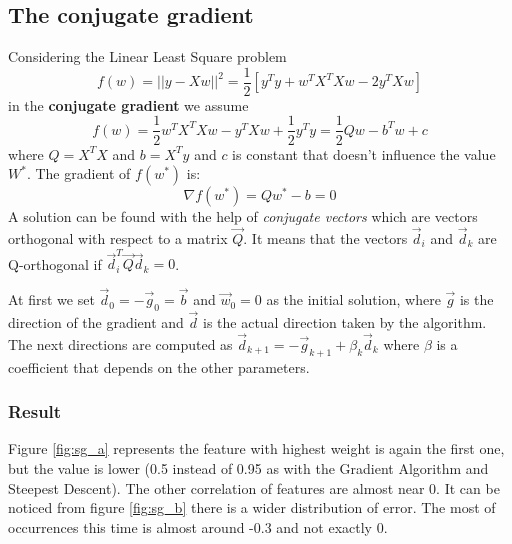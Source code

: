 \documentclass[a4paper,12pt,oneside,titlepage]{article}
\begin{document}
	
	\subsection{The conjugate gradient}
	Considering the Linear Least Square problem
	\begin{equation}
	f(w) = ||y-Xw||^2= \frac{1}{2} [y^Ty+w^TX^TXw-2y^TXw]
	\end{equation}
	in the \textbf{conjugate gradient} we assume
	\begin{equation}
	f(w) = \frac{1}{2} w^TX^TXw-y^TXw+\frac{1}{2} y^Ty =\frac{1}{2} Qw-b^Tw+c	
	\end{equation}
	where $Q=X^TX$ and $b= X^Ty$ and $c$ is constant that doesn't influence the value $W^*$. The gradient of $f(w^*)$ is:
	\begin{equation}
	\nabla f(w^*)=Qw^*-b=0
	\end{equation}
	A solution can be found with the help of \emph{conjugate vectors} which are vectors orthogonal with respect to a matrix $\vec{Q}$. It means that the vectors $\vec{d}_i$ and $\vec{d}_k$ are Q-orthogonal if $\vec{d}_i^T\vec{Q}\vec{d}_k=0$.	
	
	At first we set $\vec{d}_0=-\vec{g}_0=\vec{b}$ and $\vec{w}_0=0$ as the initial solution, where $\vec{g}$ is the direction of the gradient and $\vec{d}$ is the actual direction taken by the algorithm.
	The next directions are computed as $\vec{d}_{k+1}=-\vec{g}_{k+1}+\beta_{k}\vec{d}_k$ where $\beta$ is a coefficient that depends on the other parameters.
	
	\subsubsection{Result}
	Figure \ref{fig:sg_a} represents the feature with highest weight is again the first one, but the value is lower (0.5 instead of 0.95 as with the Gradient Algorithm and Steepest Descent). The other correlation of features are almost near 0.
	It can be noticed from figure \ref*{fig:sg_b} there is a wider distribution of error. The most of occurrences this time is almost around -0.3 and not exactly 0.  
	
\end{document}
